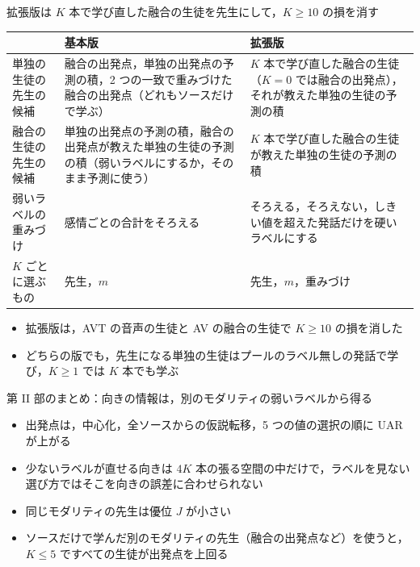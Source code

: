 \begin{frame}{拡張版は $K$ 本で学び直した融合の生徒を先生にして，$K\ge10$ の損を消す}
  \vspace{0.3em}
  \centering\scriptsize
  \renewcommand{\arraystretch}{1.35}
  \begin{tabularx}{\textwidth}{@{}l X X@{}}
    \toprule
    & \textbf{基本版} & \textbf{拡張版} \\
    \midrule
    単独の生徒の先生の候補 & 融合の出発点，単独の出発点の予測の積，2 つの一致で重みづけた融合の出発点（どれもソースだけで学ぶ） & $K$ 本で学び直した融合の生徒（$K=0$ では融合の出発点），それが教えた単独の生徒の予測の積 \\
    融合の生徒の先生の候補 & 単独の出発点の予測の積，融合の出発点が教えた単独の生徒の予測の積（弱いラベルにするか，そのまま予測に使う） & $K$ 本で学び直した融合の生徒が教えた単独の生徒の予測の積 \\
    弱いラベルの重みづけ & 感情ごとの合計をそろえる & そろえる，そろえない，しきい値を超えた発話だけを硬いラベルにする \\
    $K$ ごとに選ぶもの & 先生，$m$ & 先生，$m$，重みづけ \\
    \bottomrule
  \end{tabularx}\par
  \vspace{0.6em}\raggedright
  \begin{itemize}\scriptsize\setlength{\itemsep}{4pt}
        \item 拡張版は，AVT の音声の生徒と AV の融合の生徒で $K\ge10$ の損を消した
        \item どちらの版でも，先生になる単独の生徒はプールのラベル無しの発話で学び，$K\ge1$ では $K$ 本でも学ぶ
      \end{itemize}
\end{frame}

\begin{frame}{第 II 部のまとめ：向きの情報は，別のモダリティの弱いラベルから得る}
  \vspace{0.3em}
  \begin{itemize}\footnotesize\setlength{\itemsep}{9pt}
        \item 出発点は，中心化，全ソースからの仮説転移，5 つの値の選択の順に UAR が上がる
        \item 少ないラベルが直せる向きは $4K$ 本の張る空間の中だけで，ラベルを見ない選び方ではそこを向きの誤差に合わせられない
        \item 同じモダリティの先生は優位 $J$ が小さい
        \item ソースだけで学んだ別のモダリティの先生（融合の出発点など）を使うと，$K\le5$ ですべての生徒が出発点を上回る
      \end{itemize}
\end{frame}
